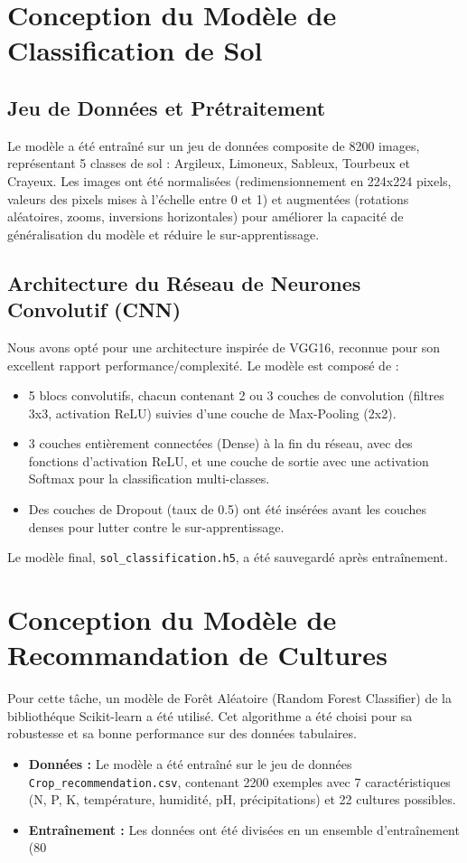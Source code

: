 \documentclass[12pt, a4paper]{report}
\begin{document}
\section{Conception du Modèle de Classification de Sol}
\subsection{Jeu de Données et Prétraitement}
Le modèle a été entraîné sur un jeu de données composite de 8200 images, représentant 5 classes de sol : Argileux, Limoneux, Sableux, Tourbeux et Crayeux. Les images ont été normalisées (redimensionnement en 224x224 pixels, valeurs des pixels mises à l'échelle entre 0 et 1) et augmentées (rotations aléatoires, zooms, inversions horizontales) pour améliorer la capacité de généralisation du modèle et réduire le sur-apprentissage.

\subsection{Architecture du Réseau de Neurones Convolutif (CNN)}
Nous avons opté pour une architecture inspirée de VGG16, reconnue pour son excellent rapport performance/complexité. Le modèle est composé de :
\begin{itemize}
    \item 5 blocs convolutifs, chacun contenant 2 ou 3 couches de convolution (filtres 3x3, activation ReLU) suivies d'une couche de Max-Pooling (2x2).
    \item 3 couches entièrement connectées (Dense) à la fin du réseau, avec des fonctions d'activation ReLU, et une couche de sortie avec une activation Softmax pour la classification multi-classes.
    \item Des couches de Dropout (taux de 0.5) ont été insérées avant les couches denses pour lutter contre le sur-apprentissage.
\end{itemize}
Le modèle final, \texttt{sol_classification.h5}, a été sauvegardé après entraînement.

\section{Conception du Modèle de Recommandation de Cultures}
Pour cette tâche, un modèle de Forêt Aléatoire (Random Forest Classifier) de la bibliothéque Scikit-learn a été utilisé. Cet algorithme a été choisi pour sa robustesse et sa bonne performance sur des données tabulaires.
\begin{itemize}
    \item \textbf{Données :} Le modèle a été entraîné sur le jeu de données \texttt{Crop_recommendation.csv}, contenant 2200 exemples avec 7 caractéristiques (N, P, K, température, humidité, pH, précipitations) et 22 cultures possibles.
    \item \textbf{Entraînement :} Les données ont été divisées en un ensemble d'entraînement (80%
\end{itemize}
\end{document}
